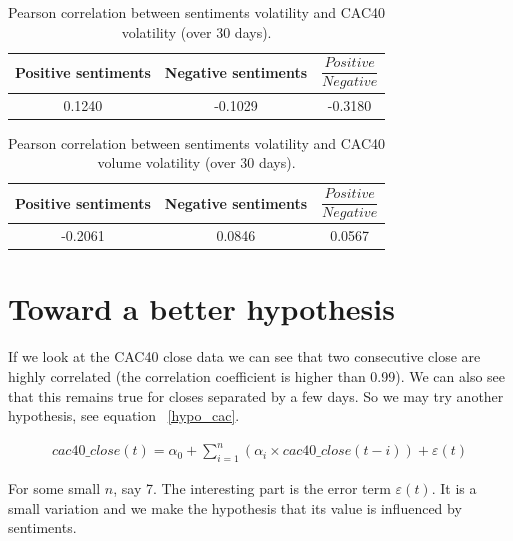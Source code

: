 \documentclass[12pt]{report}
\begin{document}
			\begin{table}
			\begin{center}
			\begin{tabular}{|c | c | c|}
				\hline
				Positive sentiments & Negative sentiments & $\dfrac{Positive}{Negative}$\\
				\hline
				0.1240 & -0.1029 & -0.3180\\
				\hline
			\end{tabular}
			\end{center}

			\caption{Pearson correlation between sentiments volatility and CAC40 volatility (over 30 days).\label{pearson_vol_cac}}
			\end{table}

			\begin{table}
			\begin{center}
			\begin{tabular}{|c | c | c|}
				\hline
				Positive sentiments & Negative sentiments & $\dfrac{Positive}{Negative}$\\
				\hline
				-0.2061 & 0.0846 & 0.0567\\
				\hline
			\end{tabular}
			\end{center}

			\caption{Pearson correlation between sentiments volatility and CAC40 volume volatility (over 30 days).\label{pearson_vol_vol}}
			\end{table}

		\section{Toward a better hypothesis}

		If we look at the CAC40 close data we can see that two consecutive close are highly correlated (the correlation coefficient is higher than 0.99). We can also see that this remains true for closes separated by a few days. So we may try another hypothesis, see equation ~\ref{hypo_cac}.

			\begin{eqnarray}
				cac40\_close(t) = \alpha_0 + \sum_{i = 1}^{n}\left(\alpha_i\times{}cac40\_close(t - i)\right) + \varepsilon(t)\label{hypo_cac}
			\end{eqnarray}

			For some small $n$, say 7. The interesting part is the error term $\varepsilon(t)$. It is a small variation and we make the hypothesis that its value is influenced by sentiments.
\end{document}
